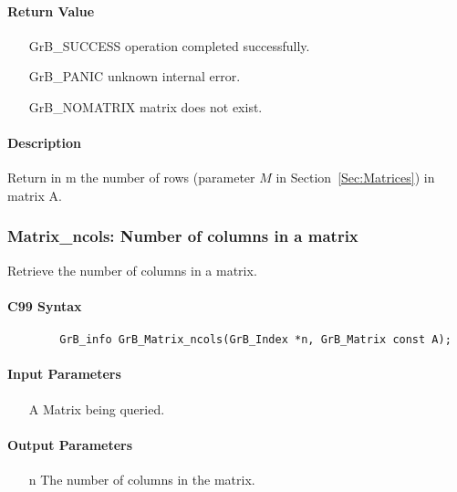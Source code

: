 \paragraph{Return Value}

\begin{itemize}[leftmargin=2.1in]
\item[{\sf GrB\_SUCCESS}]   operation completed successfully.
\item[{\sf GrB\_PANIC}]     unknown internal error.
\item[{\sf GrB\_NOMATRIX}]  matrix does not exist.
\end{itemize}

\paragraph{Description}

Return in {\sf m} the number of rows (parameter $M$ in Section~\ref{Sec:Matrices}) in matrix {\sf A}.

\subsubsection{{\sf Matrix\_ncols}: Number of columns in a matrix}

Retrieve the number of columns in a matrix.

\paragraph{C99 Syntax}

\begin{verbatim}
        GrB_info GrB_Matrix_ncols(GrB_Index *n, GrB_Matrix const A);
\end{verbatim}

\paragraph{Input Parameters}

\begin{itemize}[leftmargin=1.1in]
    \item[{\sf A}] Matrix being queried.
\end{itemize}

\paragraph{Output Parameters}
\begin{itemize}[leftmargin=1.1in]
    \item[{\sf n}] The number of columns in the matrix.
\end{itemize}

